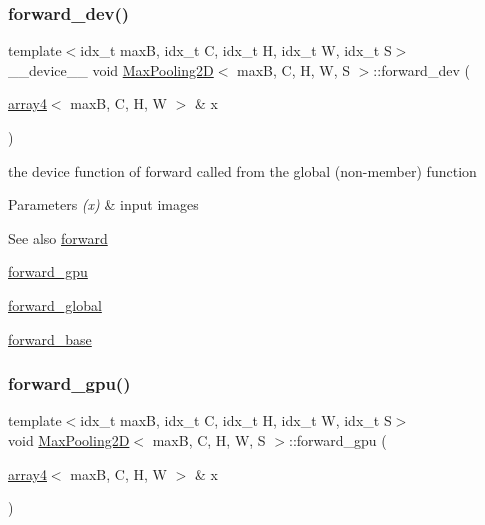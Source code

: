 \subsubsection{\texorpdfstring{forward\+\_\+dev()}{forward\_dev()}}
{\footnotesize\ttfamily template$<$idx\+\_\+t maxB, idx\+\_\+t C, idx\+\_\+t H, idx\+\_\+t W, idx\+\_\+t S$>$ \\
\+\_\+\+\_\+device\+\_\+\+\_\+ void \hyperlink{structMaxPooling2D}{Max\+Pooling2D}$<$ maxB, C, H, W, S $>$\+::forward\+\_\+dev (\begin{DoxyParamCaption}\item[{\hyperlink{structarray4}{array4}$<$ maxB, C, H, W $>$ \&}]{x }\end{DoxyParamCaption})\hspace{0.3cm}{\ttfamily [inline]}}



the device function of forward called from the global (non-\/member) function 


\begin{DoxyParams}{Parameters}
{\em (x)} & input images \\
\hline
\end{DoxyParams}
\begin{DoxySeeAlso}{See also}
\hyperlink{structMaxPooling2D_ac533b4e08d8f2e708bbdc8f8e2d784a2}{forward} 

\hyperlink{structMaxPooling2D_a4e8ee0e7bf1cc0b7688fbbe1b04019ec}{forward\+\_\+gpu} 

\hyperlink{softmaxcrossentropy_8h_a578aeeb166bd06e800d9b396eab48b35}{forward\+\_\+global} 

\hyperlink{structMaxPooling2D_adde941f72d6c91ecb63253afb845dbfa}{forward\+\_\+base} 
\end{DoxySeeAlso}
\mbox{\label{structMaxPooling2D_a4e8ee0e7bf1cc0b7688fbbe1b04019ec}} 
\subsubsection{\texorpdfstring{forward\+\_\+gpu()}{forward\_gpu()}}
{\footnotesize\ttfamily template$<$idx\+\_\+t maxB, idx\+\_\+t C, idx\+\_\+t H, idx\+\_\+t W, idx\+\_\+t S$>$ \\
void \hyperlink{structMaxPooling2D}{Max\+Pooling2D}$<$ maxB, C, H, W, S $>$\+::forward\+\_\+gpu (\begin{DoxyParamCaption}\item[{\hyperlink{structarray4}{array4}$<$ maxB, C, H, W $>$ \&}]{x }\end{DoxyParamCaption})\hspace{0.3cm}{\ttfamily [inline]}}



